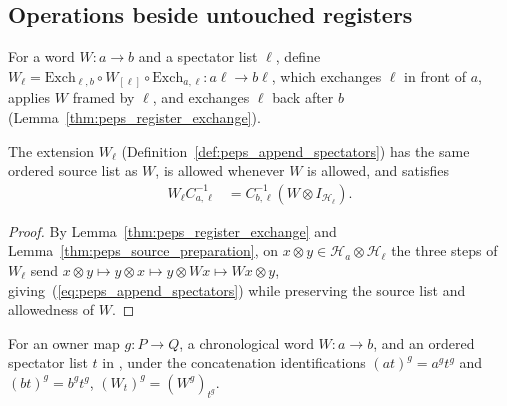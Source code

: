 \subsection{Operations beside untouched registers}

\begin{definition}
    \label{def:peps_append_spectators}
    \leanok
    For a word $W:a\to b$ and a spectator list $\ell$, define
    $W_{\ell}=\mathrm{Exch}_{\ell,b}\circ W_{[\ell]}\circ\mathrm{Exch}_{a,\ell}:a\ell\to b\ell$,
    which exchanges $\ell$ in front of $a$, applies $W$ framed by $\ell$, and
    exchanges $\ell$ back after $b$ (Lemma~\ref{thm:peps_register_exchange}).
\end{definition}

\begin{lemma}
    \label{thm:peps_append_spectators}
    \leanok
    The extension $W_{\ell}$ (Definition~\ref{def:peps_append_spectators}) has
    the same ordered source list as $W$, is allowed whenever $W$ is allowed, and
    satisfies
    \begin{align}
        W_{\ell}C_{a,\ell}^{-1}
         & =C_{b,\ell}^{-1}(W\otimes I_{\mathcal H_\ell}).
        \label{eq:peps_append_spectators}
    \end{align}
\end{lemma}

\begin{proof}
    \leanok
    By Lemma~\ref{thm:peps_register_exchange} and
    Lemma~\ref{thm:peps_source_preparation}, on $x\otimes y\in\mathcal H_a\otimes\mathcal H_\ell$
    the three steps of $W_{\ell}$ send $x\otimes y\mapsto y\otimes x\mapsto y\otimes Wx\mapsto Wx\otimes y$,
    giving~(\ref{eq:peps_append_spectators}) while preserving the source list
    and allowedness of $W$.
\end{proof}

\begin{lemma}
    \label{thm:peps_owner_spectator_extension}
    \leanok
    For an owner map $g:P\to Q$, a chronological word $W:a\to b$, and an
    ordered spectator list $t$ in
    \cite[proof of Theorem~5.2]{OpenAI2026PolynomialPEPS}, under the
    concatenation identifications $(at)^g=a^g t^g$ and $(bt)^g=b^g t^g$,
    $(W_t)^g=(W^g)_{t^g}$.
\end{lemma}

